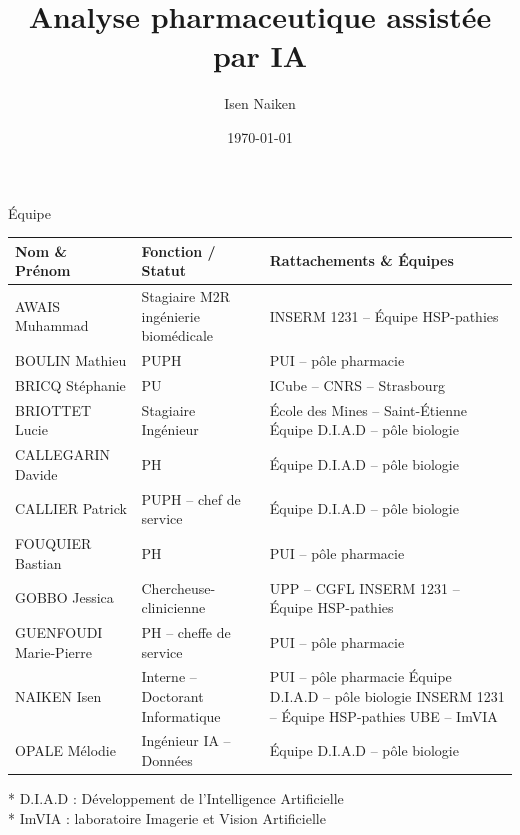 \documentclass{beamer}
\title{Analyse pharmaceutique assistée par IA}
\author{Isen Naiken}
\institute{CHU Dijon Bourgogne}
\date{\today}
\begin{document}
\begin{frame}
  \titlepage
\end{frame}

\begin{frame}{Équipe}
  \centering
  \scriptsize
  \renewcommand{\arraystretch}{1.0}
  \setlength{\tabcolsep}{4pt}
  \begin{tabular}{>{\raggedright\arraybackslash}p{2.9cm}>{\raggedright\arraybackslash}p{3.0cm}>{\raggedright\arraybackslash}p{5.0cm}}
    \toprule
    \textbf{Nom \& Prénom} & \textbf{Fonction / Statut} & \textbf{Rattachements \& Équipes} \\
    \midrule
    AWAIS Muhammad & Stagiaire M2R ingénierie biomédicale & INSERM 1231 -- Équipe HSP-pathies \\
    BOULIN Mathieu & PUPH & PUI -- pôle pharmacie \\
    BRICQ Stéphanie & PU & ICube -- CNRS -- Strasbourg \\
    BRIOTTET Lucie & Stagiaire Ingénieur & École des Mines -- Saint-Étienne \newline Équipe D.I.A.D -- pôle biologie \\
    CALLEGARIN Davide & PH & Équipe D.I.A.D -- pôle biologie \\
    CALLIER Patrick & PUPH -- chef de service & Équipe D.I.A.D -- pôle biologie \\
    FOUQUIER Bastian & PH & PUI -- pôle pharmacie \\
    GOBBO Jessica & Chercheuse-clinicienne & UPP -- CGFL \newline INSERM 1231 -- Équipe HSP-pathies \\
    GUENFOUDI Marie-Pierre & PH -- cheffe de service & PUI -- pôle pharmacie \\
    NAIKEN Isen & Interne -- Doctorant Informatique & PUI -- pôle pharmacie \newline Équipe D.I.A.D -- pôle biologie \newline INSERM 1231 -- Équipe HSP-pathies \newline UBE -- ImVIA \\
    OPALE Mélodie & Ingénieur IA -- Données & Équipe D.I.A.D -- pôle biologie \\
    \bottomrule
  \end{tabular}

  \vspace{0.3em}
  \raggedright
  \tiny
  * D.I.A.D : Développement de l'Intelligence Artificielle \\
  * ImVIA : laboratoire Imagerie et Vision Artificielle
\end{frame}
\end{document}
